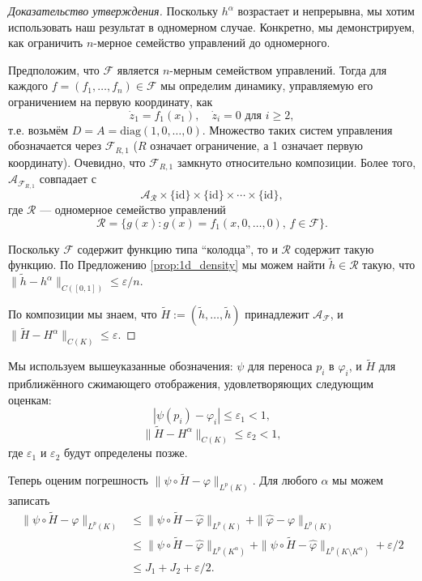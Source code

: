 \documentclass[../NDCNNAI_main.tex]{subfiles}
\begin{document}
\begin{proof}[Доказательство утверждения]
Поскольку \( h^\alpha \) возрастает и непрерывна, мы хотим использовать наш результат в одномерном случае. Конкретно, мы демонстрируем, как ограничить \( n \)-мерное семейство управлений до одномерного.

Предположим, что \(\mathcal{F}\) является \( n \)-мерным семейством управлений. Тогда для каждого \( f = (f_1, \ldots, f_n) \in \mathcal{F} \) мы определим динамику, управляемую его ограничением на первую координату, как
\[
\dot{z}_1 = f_1(x_1), \quad \dot{z}_i = 0 \text{ для } i \geq 2, 
\]
т.е. возьмём \( D = A = \text{diag}(1, 0, \ldots, 0) \). Множество таких систем управления обозначается через \( \mathcal{F}_{R,1} \) (\( R \) означает ограничение, а 1 означает первую координату). Очевидно, что \( \mathcal{F}_{R,1} \) замкнуто относительно композиции. Более того, \( \mathcal{A}_{\mathcal{F}_{R,1}} \) совпадает с
\[
\mathcal{A}_{\mathcal{R}} \times \{\text{id}\} \times \{\text{id}\} \times \cdots \times \{\text{id}\}, 
\]
где \(\mathcal{R}\) --- одномерное семейство управлений
\[
\mathcal{R} = \{g(x) : g(x) = f_1(x, 0, \ldots, 0), \, f \in \mathcal{F}\}. 
\]

Поскольку \(\mathcal{F}\) содержит функцию типа ``колодца'', то и \(\mathcal{R}\) содержит такую функцию. По Предложению \ref{prop:1d_density} мы можем найти \(\tilde{h} \in \mathcal{R}\) такую, что \(\| \tilde{h} - h^{\alpha} \|_{C([0,1])} \leq \varepsilon / n\).

По композиции мы знаем, что \(\tilde{H} := (\tilde{h}, \ldots, \tilde{h})\) принадлежит \(\mathcal{A}_{\mathcal{F}}\), и \(\|\tilde{H} - H^{\alpha}\|_{C(K)} \leq \varepsilon\).
\end{proof}

Мы используем вышеуказанные обозначения: \(\psi\) для переноса \(p_i\) в \(\varphi_i\), и \(\tilde{H}\) для приближённого сжимающего отображения, удовлетворяющих следующим оценкам:
\[
|\psi(p_i) - \varphi_i| \leq \varepsilon_1 < 1, 
\]
\[
\|\tilde{H} - H^{\alpha}\|_{C(K)} \leq \varepsilon_2 < 1,
\]
где \(\varepsilon_1\) и \(\varepsilon_2\) будут определены позже.

Теперь оценим погрешность \(\|\psi \circ \tilde{H} - \varphi\|_{L^{p}(K)}\). Для любого \(\alpha\) мы можем записать
\begin{align*}
\|\psi \circ \tilde{H} - \varphi\|_{L^{p}(K)} &\leq \|\psi \circ \tilde{H} - \hat{\varphi}\|_{L^{p}(K)} + \|\hat{\varphi} - \varphi\|_{L^{p}(K)} \\
&\leq \|\psi \circ \tilde{H} - \hat{\varphi}\|_{L^{p}(K^{\alpha})} + \|\psi \circ \tilde{H} - \hat{\varphi}\|_{L^{p}(K \setminus K^{\alpha})} + \varepsilon/2 \\
&\leq J_1 + J_2 + \varepsilon/2. 
\end{align*}
\end{document}

